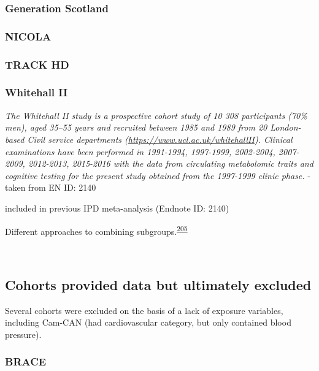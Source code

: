 \documentclass[a4paper, twoside]{templates/ociamthesis}
\begin{document}
\hypertarget{generation-scotland}{%
\subsubsection{Generation Scotland}\label{generation-scotland}}

\hypertarget{nicola}{%
\subsubsection{NICOLA}\label{nicola}}

\hypertarget{track-hd}{%
\subsubsection{TRACK HD}\label{track-hd}}

\hypertarget{whitehall-ii}{%
\subsubsection{Whitehall II}\label{whitehall-ii}}

\emph{The Whitehall II study is a prospective cohort study of 10 308 participants (70\% men), aged 35--55 years and recruited between 1985 and 1989 from 20 London-based Civil service departments (\url{https://www.ucl.ac.uk/whitehallII}). Clinical examinations have been performed in 1991-1994, 1997-1999, 2002-2004, 2007-2009, 2012-2013, 2015-2016 with the data from circulating metabolomic traits and cognitive testing for the present study obtained from the 1997-1999 clinic phase.} - taken from EN ID: 2140

included in previous IPD meta-analysis (Endnote ID: 2140)

Different approaches to combining subgroups.\textsuperscript{\protect\hyperlink{ref-fisher2017}{205}}

~

\hypertarget{cohorts-provided-data-but-ultimately-excluded}{%
\subsection{Cohorts provided data but ultimately excluded}\label{cohorts-provided-data-but-ultimately-excluded}}

Several cohorts were excluded on the basis of a lack of exposure variables, including Cam-CAN (had cardiovascular category, but only contained blood pressure).

\hypertarget{brace}{%
\subsubsection{BRACE}\label{brace}}
\end{document}
